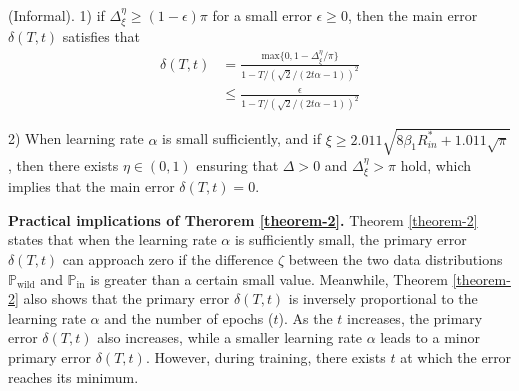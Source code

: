 \begin{theorem}\label{theorem-2}
    (Informal). 1) if $\Delta_{\xi}^{\eta} \geq (1-\epsilon)\pi$ for a small error $\epsilon \geq 0$, then the main error $\delta(T,t)$ satisfies that
    \begin{equation}
    \begin{split}
        \delta(T, t) &= \frac{\mathrm{max}\{0, 1-\Delta_{\xi}^{\eta}/\pi\}}{1-T/(\sqrt{2}/(2t\alpha - 1))^2}\\
        &\leq \frac{\epsilon}{1 - T/(\sqrt{2}/(2t\alpha - 1))^2}
    \end{split}
    \end{equation}

2) When learning rate $\alpha$ is small sufficiently, and if $\xi \geq 2.011\sqrt{8\beta_1 R_{in}^{*} + 1.011\sqrt{\pi}}$, then there exists $\eta \in (0, 1)$ ensuring that $\Delta > 0$ and $\Delta_{\xi}^{\eta}>\pi$ hold, which implies that the main error $\delta(T, t) = 0$.
\end{theorem}
\textbf{Practical implications of Therorem \ref{theorem-2}.} Theorem \ref{theorem-2} states that when the learning rate \( \alpha \) is sufficiently small, the primary error \( \delta(T,t) \) can approach zero if the difference \( \zeta \) between the two data distributions \( \mathbb{P}_{\text{wild}} \) and \( \mathbb{P}_{\text{in}} \) is greater than a certain small value. 
Meanwhile, Theorem \ref{theorem-2} also shows that the primary error \( \delta(T,t) \) is inversely proportional to the learning rate \( \alpha \) and the number of epochs ($t$). As the $t$ increases, the primary error \( \delta(T,t) \) also increases, while a smaller learning rate \( \alpha \) leads to a minor primary error \( \delta(T,t) \). However, during training, there exists \( t \) at which the error reaches its minimum.



